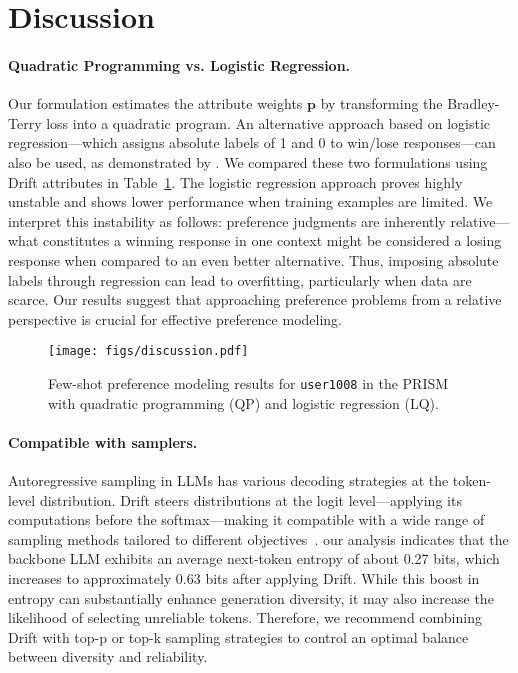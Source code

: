 \section{Discussion}

\paragraph{Quadratic Programming vs. Logistic Regression.}  
Our formulation estimates the attribute weights $\mathbf{p}$ by transforming the Bradley-Terry loss into a quadratic program. An alternative approach based on logistic regression—which assigns absolute labels of 1 and 0 to win/lose responses—can also be used, as demonstrated by \citep{go2023compositional}. 
We compared these two formulations using Drift attributes in Table~\ref{fig:discussion}. The logistic regression approach proves highly unstable and shows lower performance when training examples are limited. We interpret this instability as follows: preference judgments are inherently relative—what constitutes a winning response in one context might be considered a losing response when compared to an even better alternative. Thus, imposing absolute labels through regression can lead to overfitting, particularly when data are scarce. Our results suggest that approaching preference problems from a relative perspective is crucial for effective preference modeling.
\begin{figure}[ht]
\centering
\texttt{[image: figs/discussion.pdf]}
\caption{Few-shot preference modeling results for \texttt{user1008} in the PRISM with quadratic programming (QP) and logistic regression (LQ).}
\label{fig:discussion}
\vspace{-5mm}
\end{figure}


\paragraph{Compatible with samplers.}
\label{sec:practical-2}
Autoregressive sampling in LLMs has various decoding strategies at the token-level distribution. Drift steers distributions at the logit level—applying its computations before the softmax—making it compatible with a wide range of sampling methods tailored to different objectives~\citep{vijayakumar2016diverse, fan2018hierarchical, holtzman2019curious}. our analysis indicates that the backbone LLM exhibits an average next-token entropy of about 0.27 bits, which increases to approximately 0.63 bits after applying Drift. While this boost in entropy can substantially enhance generation diversity, it may also increase the likelihood of selecting unreliable tokens. Therefore, we recommend combining Drift with top-p or top-k sampling strategies to control an optimal balance between diversity and reliability.


